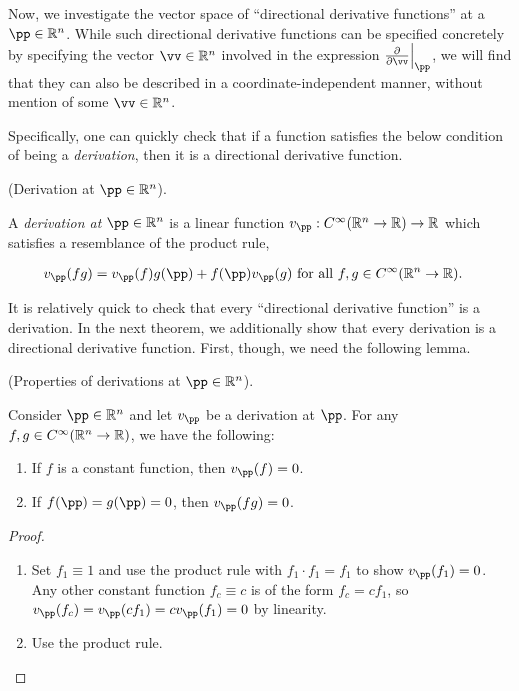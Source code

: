 Now, we investigate the vector space of ``directional derivative functions'' at a $\pp \in \R^n$. While such directional derivative functions can be specified concretely by specifying the vector $\vv \in \R^n$ involved in the expression $\frac{\pd}{\pd \vv}\Big|_\pp$, we will find that they can also be described in a coordinate-independent manner, without mention of some $\vv \in \R^n$. 

Specifically, one can quickly check that if a function satisfies the below condition of being a \textit{derivation}, then it is a directional derivative function. 

\begin{defn}
     (Derivation at $\pp \in \R^n$).
    
    A \textit{derivation at $\pp \in \R^n$} is a linear function $v_\pp:C^\infty(\R^n \rightarrow \R) \rightarrow \R$ which satisfies a resemblance of the product rule,
    
    \begin{align*}
        v_\pp(fg) &= v_\pp(f)g(\pp) + f(\pp)v_\pp(g) \text{ for all $f, g \in C^\infty(\R^n \rightarrow \R)$}.
    \end{align*}
\end{defn}

It is relatively quick to check that every ``directional derivative function'' is a derivation. In the next theorem, we additionally show that every derivation is a directional derivative function. First, though, we need the following lemma.

\begin{lemma}
\label{ch::manifolds::lemma::properties_of_derivations_Rn}
     (Properties of derivations at $\pp \in \R^n$). 
    
    Consider $\pp \in \R^n$ and let $v_\pp$ be a derivation at $\pp$. For any $f, g \in C^\infty(\mathbb{R}^n \rightarrow \mathbb{R})$, we have the following:
    
    \begin{enumerate}
        \item If $f$ is a constant function, then $v_\pp(f) = 0$.
        \item If $f(\pp) = g(\pp) = 0$, then $v_\pp(fg) = 0$.
    \end{enumerate}
\end{lemma}

\begin{proof}
    \mbox{} \\
    \begin{enumerate}
        \item Set $f_1 \equiv 1$ and use the product rule with $f_1 \cdot f_1 = f_1$ to show $v_\pp(f_1) = 0$. Any other constant function $f_c \equiv c$ is of the form $f_c = cf_1$, so $v_\pp(f_c) = v_\pp(cf_1) = cv_\pp(f_1) = 0$ by linearity.
        \item Use the product rule.
    \end{enumerate}
\end{proof}

